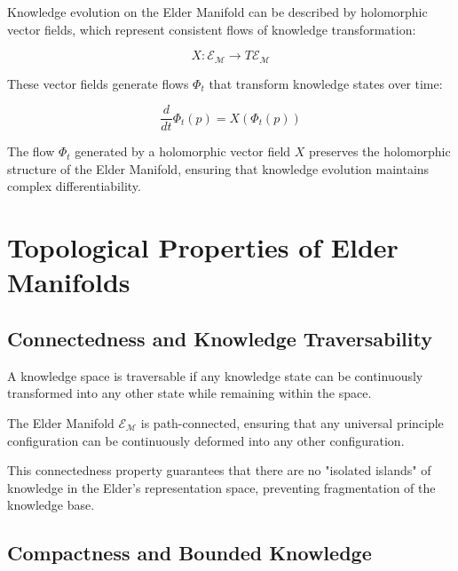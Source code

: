 Knowledge evolution on the Elder Manifold can be described by holomorphic vector fields, which represent consistent flows of knowledge transformation:

\begin{equation}
X: \mathcal{E}_{\mathcal{M}} \rightarrow T\mathcal{E}_{\mathcal{M}}
\end{equation}

These vector fields generate flows $\Phi_t$ that transform knowledge states over time:

\begin{equation}
\frac{d}{dt}\Phi_t(p) = X(\Phi_t(p))
\end{equation}

\begin{proposition}
The flow $\Phi_t$ generated by a holomorphic vector field $X$ preserves the holomorphic structure of the Elder Manifold, ensuring that knowledge evolution maintains complex differentiability.
\end{proposition}

\section{Topological Properties of Elder Manifolds}

\subsection{Connectedness and Knowledge Traversability}

\begin{definition}
A knowledge space is traversable if any knowledge state can be continuously transformed into any other state while remaining within the space.
\end{definition}

\begin{theorem}
The Elder Manifold $\mathcal{E}_{\mathcal{M}}$ is path-connected, ensuring that any universal principle configuration can be continuously deformed into any other configuration.
\end{theorem}

This connectedness property guarantees that there are no "isolated islands" of knowledge in the Elder's representation space, preventing fragmentation of the knowledge base.

\subsection{Compactness and Bounded Knowledge}

